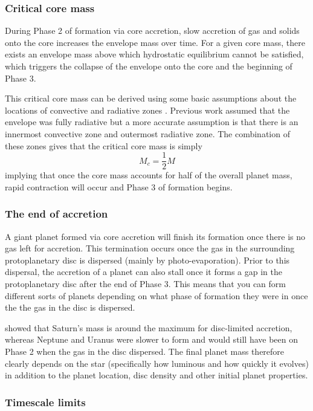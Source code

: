 \documentclass[twocolumn]{aastex631}
\begin{document}
\subsubsection{Critical core mass}

During Phase 2 of formation via core accretion, slow accretion of gas and solids onto the core increases the envelope mass over time. For a given core mass, there exists an envelope mass above which hydrostatic equilibrium cannot be satisfied, which triggers the collapse of the envelope onto the core and the beginning of Phase 3.

This critical core mass can be derived using some basic assumptions about the locations of convective and radiative zones \citep{Stevenson+1982,Lissauer+2009}. Previous work assumed that the envelope was fully radiative but a more accurate assumption is that there is an innermost convective zone and outermost radiative zone. The combination of these zones gives that the critical core mass is simply
\begin{equation}
    M_{c} = \frac{1}{2} M
\end{equation}
implying that once the core mass accounts for half of the overall planet mass, rapid contraction will occur and Phase 3 of formation begins.

\subsubsection{The end of accretion}

A giant planet formed via core accretion will finish its formation once there is no gas left for accretion. This termination occurs once the gas in the surrounding protoplanetary disc is dispersed (mainly by photo-evaporation). Prior to this dispersal, the accretion of a planet can also stall once it forms a gap in the protoplanetary disc after the end of Phase 3. This means that you can form different sorts of planets depending on what phase of formation they were in once the the gas in the disc is dispersed.

\citet{Lissauer+2009} showed that Saturn's mass is around the maximum for disc-limited accretion, whereas Neptune and Uranus were slower to form and would still have been on Phase 2 when the gas in the disc dispersed. The final planet mass therefore clearly depends on the star (specifically how luminous and how quickly it evolves) in addition to the planet location, disc density and other initial planet properties.

\subsubsection{Timescale limits}
\end{document}
